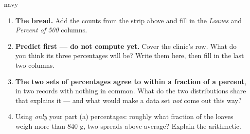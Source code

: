 \begin{scenariobox}{navy}
\vspace{2pt}
\normalsize
\begin{enumerate}[label=\textbf{\alph*.}, leftmargin=1.8em, itemsep=4pt]
  \item \textbf{The bread.} Add the counts from the strip above and fill in the \emph{Loaves} and
        \emph{Percent of 500} columns.
  \item \textbf{Predict first --- do not compute yet.} Cover the clinic's row. What do you think
        its three percentages will be? Write them here, then fill in the last two columns.
        \answerspace{1.2cm}{}
  \item \textbf{The two sets of percentages agree to within a fraction of a percent}, in two
        records with nothing in common. What do the two distributions share that explains it ---
        and what would make a data set \emph{not} come out this way?
        \answerspace{2.2cm}{}
  \item Using \emph{only} your part (a) percentages: roughly what fraction of the loaves weigh
        more than 840 g, two spreads above average? Explain the arithmetic.
        \answerspace{1.6cm}{}
\end{enumerate}
\end{scenariobox}

